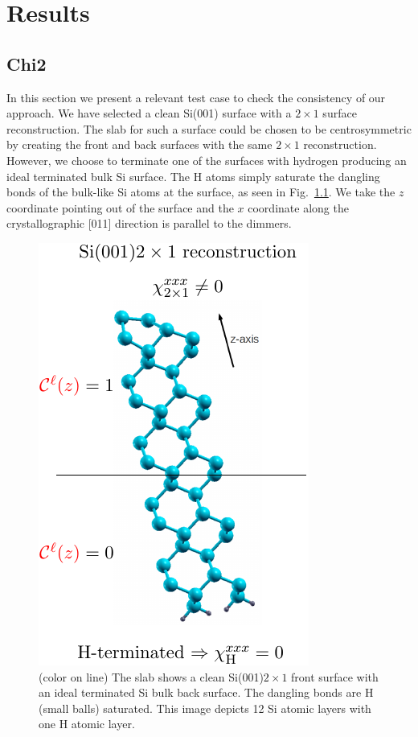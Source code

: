 \chapter{Results}\label{chap:results}

\section{Chi2}

In this section we present a relevant test case to check the consistency of our
approach. We have selected a clean Si(001) surface with a $2\times 1$ surface
reconstruction. The slab for such a surface could be chosen to be
centrosymmetric by creating the front and back surfaces with the same $2\times
1$ reconstruction. However, we choose to terminate one of the surfaces with
hydrogen producing an ideal terminated bulk Si surface. The H atoms simply
saturate the dangling bonds of the bulk-like Si atoms at the surface, as seen in
Fig.~\ref{si2x1}. We take the $z$ coordinate pointing out of the surface and the
$x$ coordinate along the crystallographic [011] direction is parallel to the
dimmers.
\begin{figure}
\centering 
\includegraphics[scale=.8]{figures/03-results/chi2/fig2}
\caption{(color on line) The slab shows a 
clean Si(001)$2\times 1$ front surface with an ideal terminated Si bulk back
surface. The dangling bonds are H (small balls) saturated. This image depicts 12
Si atomic layers with one H atomic layer.
\label{si2x1}} 
\end{figure} 
